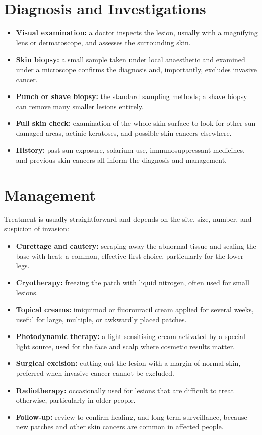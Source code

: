 \section*{Diagnosis and Investigations}
\begin{itemize}
    \item \textbf{Visual examination:} a doctor inspects the lesion, usually with a magnifying lens or dermatoscope, and assesses the surrounding skin.
    \item \textbf{Skin biopsy:} a small sample taken under local anaesthetic and examined under a microscope confirms the diagnosis and, importantly, excludes invasive cancer.
    \item \textbf{Punch or shave biopsy:} the standard sampling methods; a shave biopsy can remove many smaller lesions entirely.
    \item \textbf{Full skin check:} examination of the whole skin surface to look for other sun-damaged areas, actinic keratoses, and possible skin cancers elsewhere.
    \item \textbf{History:} past sun exposure, solarium use, immunosuppressant medicines, and previous skin cancers all inform the diagnosis and management.
\end{itemize}

\section*{Management}
Treatment is usually straightforward and depends on the site, size, number, and suspicion of invasion:
\begin{itemize}
    \item \textbf{Curettage and cautery:} scraping away the abnormal tissue and sealing the base with heat; a common, effective first choice, particularly for the lower legs.
    \item \textbf{Cryotherapy:} freezing the patch with liquid nitrogen, often used for small lesions.
    \item \textbf{Topical creams:} imiquimod or fluorouracil cream applied for several weeks, useful for large, multiple, or awkwardly placed patches.
    \item \textbf{Photodynamic therapy:} a light-sensitising cream activated by a special light source, used for the face and scalp where cosmetic results matter.
    \item \textbf{Surgical excision:} cutting out the lesion with a margin of normal skin, preferred when invasive cancer cannot be excluded.
    \item \textbf{Radiotherapy:} occasionally used for lesions that are difficult to treat otherwise, particularly in older people.
    \item \textbf{Follow-up:} review to confirm healing, and long-term surveillance, because new patches and other skin cancers are common in affected people.
\end{itemize}


